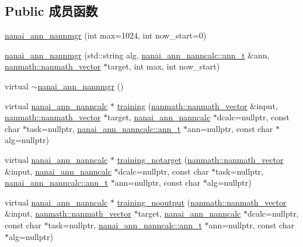 \subsection*{Public 成员函数}
\begin{DoxyCompactItemize}
\item 
\hyperlink{classnanai_1_1nanai__ann__nannmgr_ac0ab089eae09f4d317218fcad3cfe804}{nanai\+\_\+ann\+\_\+nannmgr} (int max=1024, int now\+\_\+start=0)
\item 
\hyperlink{classnanai_1_1nanai__ann__nannmgr_aa25b7ed3134765348dca37cf200cff3b}{nanai\+\_\+ann\+\_\+nannmgr} (std\+::string alg, \hyperlink{classnanai_1_1nanai__ann__nanncalc_1_1ann__t}{nanai\+\_\+ann\+\_\+nanncalc\+::ann\+\_\+t} \&ann, \hyperlink{classnanmath_1_1nanmath__vector}{nanmath\+::nanmath\+\_\+vector} $\ast$target, int max, int now\+\_\+start)
\item 
virtual \hyperlink{classnanai_1_1nanai__ann__nannmgr_a2594f0a16aed65087e4aebca1b07894e}{$\sim$nanai\+\_\+ann\+\_\+nannmgr} ()
\item 
virtual \hyperlink{classnanai_1_1nanai__ann__nanncalc}{nanai\+\_\+ann\+\_\+nanncalc} $\ast$ \hyperlink{classnanai_1_1nanai__ann__nannmgr_a1b99f051a2a7b2b1ebb21bb45d567afa}{training} (\hyperlink{classnanmath_1_1nanmath__vector}{nanmath\+::nanmath\+\_\+vector} \&input, \hyperlink{classnanmath_1_1nanmath__vector}{nanmath\+::nanmath\+\_\+vector} $\ast$target, \hyperlink{classnanai_1_1nanai__ann__nanncalc}{nanai\+\_\+ann\+\_\+nanncalc} $\ast$dcalc=nullptr, const char $\ast$task=nullptr, \hyperlink{classnanai_1_1nanai__ann__nanncalc_1_1ann__t}{nanai\+\_\+ann\+\_\+nanncalc\+::ann\+\_\+t} $\ast$ann=nullptr, const char $\ast$alg=nullptr)
\item 
virtual \hyperlink{classnanai_1_1nanai__ann__nanncalc}{nanai\+\_\+ann\+\_\+nanncalc} $\ast$ \hyperlink{classnanai_1_1nanai__ann__nannmgr_a7a28db94886caffa0824206c0e2b2fa9}{training\+\_\+notarget} (\hyperlink{classnanmath_1_1nanmath__vector}{nanmath\+::nanmath\+\_\+vector} \&input, \hyperlink{classnanai_1_1nanai__ann__nanncalc}{nanai\+\_\+ann\+\_\+nanncalc} $\ast$dcalc=nullptr, const char $\ast$task=nullptr, \hyperlink{classnanai_1_1nanai__ann__nanncalc_1_1ann__t}{nanai\+\_\+ann\+\_\+nanncalc\+::ann\+\_\+t} $\ast$ann=nullptr, const char $\ast$alg=nullptr)
\item 
virtual \hyperlink{classnanai_1_1nanai__ann__nanncalc}{nanai\+\_\+ann\+\_\+nanncalc} $\ast$ \hyperlink{classnanai_1_1nanai__ann__nannmgr_a7461a5cad561f578869c850adf1e9639}{training\+\_\+nooutput} (\hyperlink{classnanmath_1_1nanmath__vector}{nanmath\+::nanmath\+\_\+vector} \&input, \hyperlink{classnanmath_1_1nanmath__vector}{nanmath\+::nanmath\+\_\+vector} $\ast$target, \hyperlink{classnanai_1_1nanai__ann__nanncalc}{nanai\+\_\+ann\+\_\+nanncalc} $\ast$dcalc=nullptr, const char $\ast$task=nullptr, \hyperlink{classnanai_1_1nanai__ann__nanncalc_1_1ann__t}{nanai\+\_\+ann\+\_\+nanncalc\+::ann\+\_\+t} $\ast$ann=nullptr, const char $\ast$alg=nullptr)

\end{DoxyCompactItemize}
